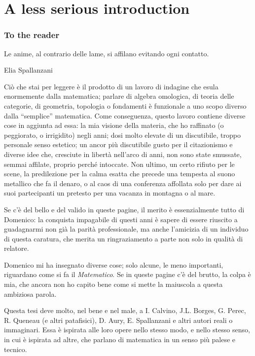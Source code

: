 \chapter*{A less serious introduction}
\thispagestyle{empty}
\subsection*{To the reader}
\epigraph{Le anime, al contrario delle lame, si affilano evitando ogni contatto.}{Elia Spallanzani}
Ciò che stai per leggere è il prodotto di un lavoro di indagine che esula enormemente dalla matematica; parlare di algebra omologica, di teoria delle categorie, di geometria, topologia o fondamenti è funzionale a uno scopo diverso dalla ``semplice'' matematica. Come conseguenza, questo lavoro contiene diverse cose in aggiunta ad essa: la mia visione della materia, che ho raffinato (o peggiorato, o irrigidito) negli anni; dosi molto elevate di un discutibile, troppo personale senso estetico; un ancor più discutibile gusto per il citazionismo e diverse idee che, cresciute in libertà nell'arco di anni, non sono state smussate, semmai affilate, proprio perché intoccate. Non ultimo, un certo rifiuto per le scene, la predilezione per la calma esatta che precede una tempesta al suono metallico che fa il denaro, o al caos di una conferenza affollata solo per dare ai suoi partecipanti un pretesto per una vacanza in montagna o al mare.

Se c'è del bello e del valido in queste pagine, il merito è essenzialmente tutto di Domenico: la conquista impagabile di questi anni è sapere di essere riuscito a guadagnarmi non già la parità professionale, ma anche l'amicizia di un  individuo di questa caratura, che merita un ringraziamento a parte non solo in qualità di relatore.

Domenico mi ha insegnato diverse cose; solo alcune, le meno importanti, riguardano come si fa il \emph{Matematico}. Se in queste pagine c'è del brutto, la colpa è mia, che ancora non ho capito bene come si mette la maiuscola a questa ambiziosa parola.

Questa tesi deve molto, nel bene e nel male, a I\@. Calvino, J.L\@. Borges, G\@. Perec, R\@. Queneau (e altri patafisici), D\@. Aury, E\@. Spallanzani e altri autori reali o immaginari. Essa è ispirata alle loro opere nello stesso modo, e nello stesso senso, in cui è ispirata ad altre, che parlano di matematica in un senso più palese e tecnico.

